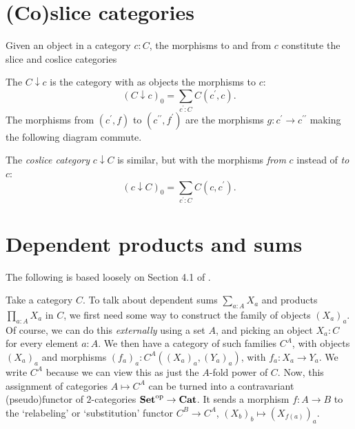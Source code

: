 \section{(Co)slice categories}
Given an object in a category $ c: C $, the morphisms to and from $ c $ constitute the slice and coslice categories
\begin{definition}
  The  $ C \downarrow c $ is the category with as objects the morphisms to $ c $:
  \[ (C \downarrow c)_0 = \sum_{c^\prime: C} C(c^\prime, c). \]
  The morphisms from $ (c^\prime, f) $ to $ (c^{\prime\prime}, f^\prime) $ are the morphisms $ g: c^\prime \to c^{\prime\prime} $ making the following diagram commute.
  \begin{center}
  \end{center}
\end{definition}
The \textit{coslice category} $ c \downarrow C $ is similar, but with the morphisms \textit{from} $ c $ instead of \textit{to} $ c $:
\[ (c \downarrow C)_0 = \sum_{c^\prime: C} C(c, c^\prime). \]

\section{Dependent products and sums}\label{sec:dependent-products}
The following is based loosely on Section 4.1 of \cite{taylor}.

Take a category $ C $. To talk about dependent sums $ \sum_{a: A} X_a $ and products $ \prod_{a: A} X_a $ in $ C $, we first need some way to construct the family of objects $ (X_a)_a $. Of course, we can do this \textit{externally} using a set $ A $, and picking an object $ X_a : C $ for every element $ a : A $. We then have a category of such families $ C^A $, with objects $ (X_a)_a $ and morphisms $ (f_a)_a: C^A((X_a)_a, (Y_a)_a) $, with $ f_a: X_a \to Y_a $. We write $ C^A $ because we can view this as just the $ A $-fold power of $ C $. Now, this assignment of categories $ A \mapsto C^A $ can be turned into a contravariant (pseudo)functor of $ 2 $-categories $ \mathbf{Set}^{\text{op}} \to \mathbf{Cat} $. It sends a morphism $ f: A \to B $ to the `relabeling' or `substitution' functor $ C^B \to C^A $, $ (X_b)_b \mapsto (X_{f(a)})_a $.

